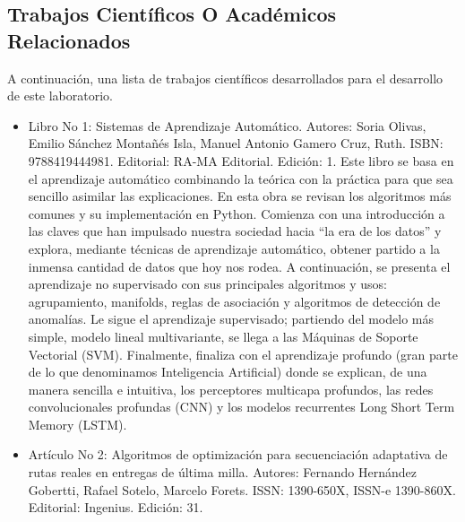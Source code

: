 \documentclass[conference]{IEEEtran}
\begin{document}
	\subsection{Trabajos Científicos O Académicos Relacionados}
	A continuación, una lista de trabajos científicos desarrollados para el desarrollo de este laboratorio.
	\begin{itemize}
		\item Libro No 1: Sistemas de Aprendizaje Automático. Autores: Soria Olivas, Emilio Sánchez Montañés Isla, Manuel Antonio Gamero Cruz, Ruth. ISBN: 9788419444981. Editorial: RA-MA Editorial. Edición: 1.
		Este libro se basa en el aprendizaje automático combinando la teórica con la práctica para que sea sencillo asimilar las explicaciones. En esta obra se revisan los algoritmos más comunes y su implementación en Python. Comienza con una introducción a las claves que han impulsado nuestra sociedad hacia “la era de los datos” y explora, mediante técnicas de aprendizaje automático, obtener partido a la inmensa cantidad de datos que hoy nos rodea. A continuación, se presenta el aprendizaje no supervisado con sus principales algoritmos y usos: agrupamiento, manifolds, reglas de asociación y algoritmos de detección de anomalías. Le sigue el aprendizaje supervisado; partiendo del modelo más simple, modelo lineal multivariante, se llega a las Máquinas de Soporte Vectorial (SVM). Finalmente, finaliza con el aprendizaje profundo (gran parte de lo que denominamos Inteligencia Artificial) donde se explican, de una manera sencilla e intuitiva, los perceptores multicapa profundos, las redes convolucionales profundas (CNN) y los modelos recurrentes Long Short Term Memory (LSTM).
		\item Artículo No 2: Algoritmos de optimización para secuenciación adaptativa de rutas reales en entregas de última milla. Autores: Fernando Hernández Gobertti, Rafael Sotelo, Marcelo Forets. ISSN: 1390-650X, ISSN-e 1390-860X. Editorial: Ingenius. Edición: 31. 

\end{itemize}
\end{document}
